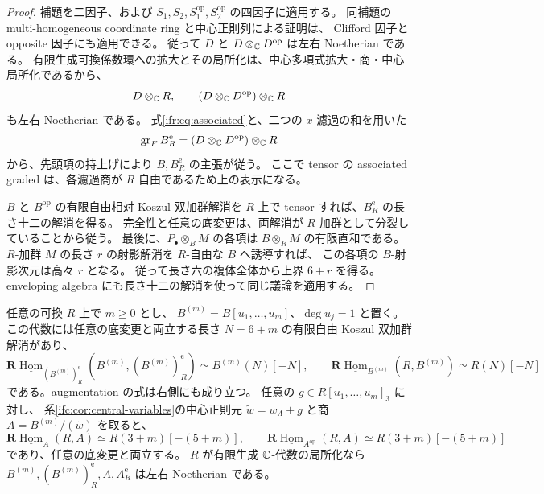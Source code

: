 \begin{proof}
補題を二因子、および
$S_1,S_2,S_1^{\mathrm{op}},S_2^{\mathrm{op}}$ の四因子に適用する。
同補題の multi-homogeneous coordinate ring と中心正則列による証明は、
Clifford 因子と opposite 因子にも適用できる。
従って $D$ と $D\otimes_\mathbb C D^{\mathrm{op}}$ は左右 Noetherian である。
有限生成可換係数環への拡大とその局所化は、中心多項式拡大・商・中心局所化であるから、
\[
 D\otimes_\mathbb C R,\qquad
 (D\otimes_\mathbb C D^{\mathrm{op}})\otimes_\mathbb C R
\]
も左右 Noetherian である。
式\eqref{ifr:eq:associated}と、二つの $x$-濾過の和を用いた
\[
 \operatorname{gr}_F B_R^{\mathrm e}
              =(D\otimes_\mathbb C D^{\mathrm{op}})\otimes_\mathbb C R
\]
から、先頭項の持上げにより $B,B_R^{\mathrm e}$ の主張が従う。
ここで tensor の associated graded は、各濾過商が $R$ 自由であるため上の表示になる。

$B$ と $B^{\mathrm{op}}$ の有限自由相対 Koszul 双加群解消を $R$ 上で
tensor すれば、$B_R^{\mathrm e}$ の長さ十二の解消を得る。
完全性と任意の底変更は、両解消が $R$-加群として分裂していることから従う。
最後に、$P_\bullet\otimes_BM$ の各項は $B\otimes_RM$ の有限直和である。
$R$-加群 $M$ の長さ $r$ の射影解消を $R$-自由な $B$ へ誘導すれば、
この各項の $B$-射影次元は高々 $r$ となる。
従って長さ六の複体全体から上界 $6+r$ を得る。
enveloping algebra にも長さ十二の解消を使って同じ議論を適用する。
\end{proof}

\begin{corollary}
\label{ifr:cor:central-extension}
任意の可換 $R$ 上で $m\ge0$ とし、
$B^{(m)}=B[u_1,\ldots,u_m]$、$\deg u_j=1$ と置く。
この代数には任意の底変更と両立する長さ $N=6+m$ の有限自由 Koszul 双加群解消があり、
\[
 \mathbf R\underline{\operatorname{Hom}}_{(B^{(m)})_R^{\mathrm e}}
       (B^{(m)},(B^{(m)})_R^{\mathrm e})\simeq B^{(m)}(N)[-N],
 \qquad
 \mathbf R\underline{\operatorname{Hom}}_{B^{(m)}}(R,B^{(m)})
                      \simeq R(N)[-N]
\]
である。augmentation の式は右側にも成り立つ。
任意の $g\in R[u_1,\ldots,u_m]_3$ に対し、
系\ref{ifc:cor:central-variables}の中心正則元
$\widetilde w=w_\Lambda+g$ と商 $A=B^{(m)}/(\widetilde w)$ を取ると、
\begin{equation}\label{ifr:eq:quotient-augmentation}
 \mathbf R\underline{\operatorname{Hom}}_A(R,A)
       \simeq R(3+m)[-(5+m)],\qquad
 \mathbf R\underline{\operatorname{Hom}}_{A^{\mathrm{op}}}(R,A)
       \simeq R(3+m)[-(5+m)]
\end{equation}
であり、任意の底変更と両立する。
$R$ が有限生成 $\mathbb C$-代数の局所化なら
$B^{(m)},(B^{(m)})_R^{\mathrm e},A,A_R^{\mathrm e}$ は左右 Noetherian である。
\end{corollary}

